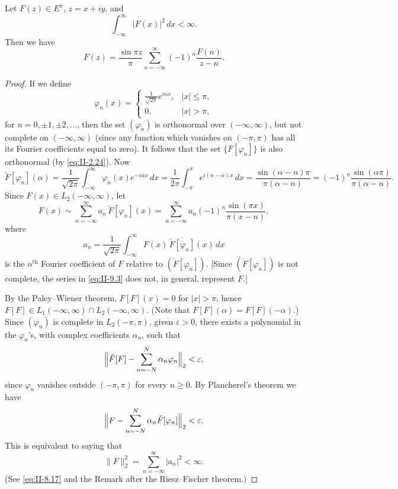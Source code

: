 \begin{theorem}[Hardy]\label{thm:II-11}
Let $F(z)\in E^{\pi}$, $z=x+iy$, and
\begin{equation}\tag{9.1}\label{eq:II-9.1}
\int_{-\infty}^{\infty}|F(x)|^{2}\,dx<\infty.
\end{equation}
Then we have
\begin{equation}\tag{9.2}\label{eq:II-9.2}
F(z)=\frac{\sin\pi z}{\pi}\sum_{n=-\infty}^{\infty}(-1)^{n}\frac{F(n)}{z-n}.
\end{equation}
\end{theorem}
\begin{proof}
If we define
\[
\varphi_{n}(x)=
\begin{cases}
\frac{1}{\sqrt{2\pi}}e^{inx}, & |x|\le\pi,\\
0, & |x|>\pi,
\end{cases}
\]
for $n=0,\pm1,\pm2,\dots$, then the set $(\varphi_{n})$ is orthonormal over $(-\infty,\infty)$, but not complete on $(-\infty,\infty)$ (since any function which vanishes on $(-\pi,\pi)$ has all its Fourier coefficients equal to zero). It follows that the set $\{F[\varphi_{n}]\}$ is also orthonormal (by \eqref{eq:II-2.24}). Now
\[
\check F[\varphi_{n}](\alpha)
=\frac{1}{\sqrt{2\pi}}\int_{-\infty}^{\infty}\varphi_{n}(x)e^{-i\alpha x}\,dx
=\frac{1}{2\pi}\int_{-\pi}^{\pi}e^{i(n-\alpha)x}\,dx
=\frac{\sin(\alpha-n)\pi}{\pi(\alpha-n)}
=(-1)^{n}\frac{\sin(\alpha\pi)}{\pi(\alpha-n)}.
\]
Since $F(x)\in L_{2}(-\infty,\infty)$, let
\begin{equation}\tag{9.3}\label{eq:II-9.3}
F(x)\sim\sum_{n=-\infty}^{\infty}a_{n}\,\check F[\varphi_{n}](x)
=\sum_{n=-\infty}^{\infty}a_{n}(-1)^{n}\frac{\sin(\pi x)}{\pi(x-n)},
\end{equation}
where
\[
a_{n}=\frac{1}{\sqrt{2\pi}}\int_{-\infty}^{\infty}F(x)\,\overline{\check F[\varphi_{n}]}(x)\,dx
\]
is the $n^{\text{th}}$ Fourier coefficient of $F$ relative to $(\check F[\varphi_{n}])$. [Since $(\check F[\varphi_{n}])$ is not complete, the series in \eqref{eq:II-9.3} does not, in general, represent $F$.]

By the Paley--Wiener theorem, $F[F](x)=0$ for $|x|>\pi$, hence $F[F]\in L_{1}(-\infty,\infty)\cap L_{2}(-\infty,\infty)$. (Note that $F[F](\alpha)=F[F](-\alpha)$.) Since $(\varphi_{n})$ is complete in $L_{2}(-\pi,\pi)$, given $\varepsilon>0$, there exists a polynomial in the $\varphi_{n}$'s, with complex coefficients $\alpha_{n}$, such that
\[
\Bigl\|\check F[F]-\sum_{n=-N}^{N}\alpha_{n}\varphi_{n}\Bigr\|_{2}<\varepsilon,
\]
since $\varphi_{n}$ vanishes outside $(-\pi,\pi)$ for every $n\ge 0$. By Plancherel's theorem we have
\[
\Bigl\|F-\sum_{n=-N}^{N}\alpha_{n}\check F[\varphi_{n}]\Bigr\|_{2}<\varepsilon.
\]
This is equivalent to saying that
\begin{equation}\tag{9.4}\label{eq:II-9.4}
\|F\|_{2}^{2}=\sum_{n=-\infty}^{\infty}|a_{n}|^{2}<\infty.
\end{equation}
(See \eqref{eq:II-8.17} and the Remark after the Riesz--Fischer theorem.)


\end{proof}
